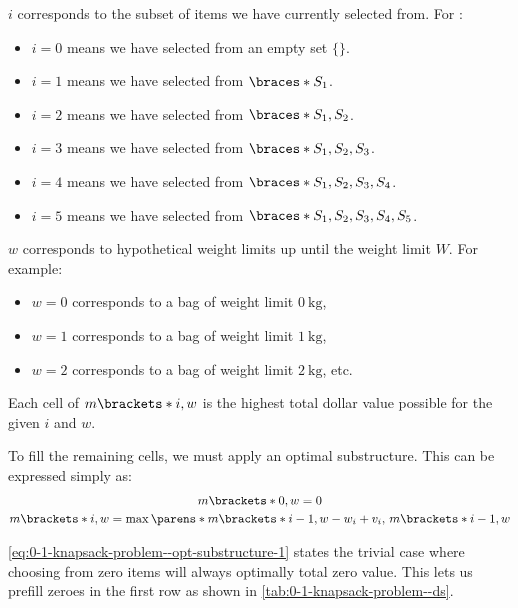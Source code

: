 $i$ corresponds to the subset of items we have currently selected from. For :
\begin{itemize}
    \item $i = 0$ means we have selected from an empty set $\{\}$.
    \item $i = 1$ means we have selected from $\braces*{S_1}$.
    \item $i = 2$ means we have selected from $\braces*{S_1, S_2}$.
    \item $i = 3$ means we have selected from $\braces*{S_1, S_2, S_3}$.
    \item $i = 4$ means we have selected from $\braces*{S_1, S_2, S_3, S_4}$.
    \item $i = 5$ means we have selected from $\braces*{S_1, S_2, S_3, S_4, S_5}$.
\end{itemize}

$w$ corresponds to hypothetical weight limits up until the weight limit $W$. For example:
\begin{itemize}
    \item $w = 0$ corresponds to a bag of weight limit $\qty{0}{\kilo\gram}$,
    \item $w = 1$ corresponds to a bag of weight limit $\qty{1}{\kilo\gram}$,
    \item $w = 2$ corresponds to a bag of weight limit $\qty{2}{\kilo\gram}$, etc.
\end{itemize}

Each cell of $m\brackets*{i, w}$ is the highest total dollar value possible for the given $i$ and $w$.

To fill the remaining cells, we must apply an optimal substructure. This can be expressed simply as:
\begin{gather}
    m \brackets*{0, w} = 0
        \label{eq:0-1-knapsack-problem--opt-substructure-1} \\
    m \brackets*{i, w} = \max\parens*{
        m \brackets*{i - 1, w - w_i} + v_i, \,
        m \brackets*{i - 1, w}
    }
        \label{eq:0-1-knapsack-problem--opt-substructure-2}
\end{gather}

\eqref{eq:0-1-knapsack-problem--opt-substructure-1} states the trivial case where choosing from zero items will always optimally total zero value. This lets us prefill zeroes in the first row as shown in \cref{tab:0-1-knapsack-problem--ds}.

